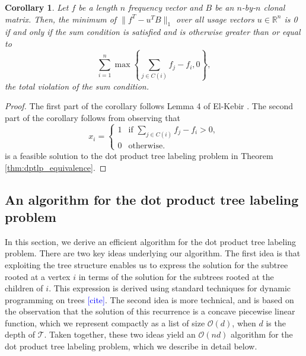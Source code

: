 \documentclass[10pt]{article}
\newtheorem{corollary}{Corollary}
\newcommand{\henri}[1]{\textcolor{blue}{[#1]}}
\newcommand{\tree}{\mathcal{T}}
\begin{document}
\begin{corollary}
    Let $f$ be a length $n$ frequency vector and $B$ be an $n$-by-$n$ clonal matrix.
    Then, the minimum of $\lVert f^T - u^TB \rVert_1$ over all usage vectors $u \in \mathbb{R}^n$
    is 0 if and only if the sum condition is satisfied and is otherwise
    greater than or equal to 
    \[\sum_{i=1}^n \max\left\{\sum_{j \in C(i)} f_j - f_i, 0\right\},\]
    the total violation of the sum condition.
\end{corollary}
\begin{proof}
    The first part of the corollary follows Lemma 4 of El-Kebir \cite{el-kebir_reconstruction_2015}. 
    The second part of the corollary follows from observing that 
    \[x_i = \begin{cases}
        1 &\text{if } \sum_{j \in C(i)} f_j - f_i > 0,\\
        0 &\text{otherwise.}
    \end{cases}\]
    is a feasible solution to the dot product tree labeling problem in Theorem \ref{thm:dptlp_equivalence}.
\end{proof}

\subsection{An algorithm for the dot product tree labeling problem}

In this section, we derive an efficient algorithm for the dot product tree labeling problem. 
There are two key ideas underlying our algorithm. The first idea is that 
exploiting the tree structure enables us to express the solution for the subtree rooted at a vertex $i$
in terms of the solution for the subtrees rooted at the children of $i$. This expression is derived using standard techniques 
for dynamic programming on trees \henri{cite}. The second idea is more technical, and is based on the observation
that the solution of this recurrence is a concave piecewise linear function, which we represent compactly as a list of size 
$\mathcal{O}(d)$, when $d$ is the depth of $\tree$. Taken together, these two ideas yield an $\mathcal{O}(nd)$ algorithm for the dot product tree 
labeling problem, which we describe in detail below.
\end{document}
